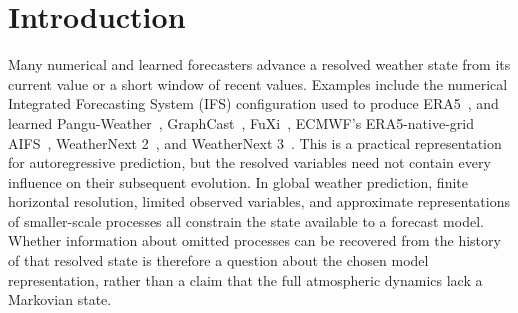 %
%

\section{Introduction}

Many numerical and learned forecasters advance a resolved weather state from its current value or a short window of recent values. Examples include the numerical Integrated Forecasting System (IFS) configuration used to produce ERA5~\cite{ecmwf2016ifsdynamics,hersbach2020era5}, and learned Pangu-Weather~\cite{bi2023pangu}, GraphCast~\cite{lam2023graphcast}, FuXi~\cite{chen2023fuxi}, ECMWF's ERA5-native-grid AIFS~\cite{lang2024aifs}, WeatherNext 2~\cite{alet2025weathernext2}, and WeatherNext 3~\cite{rasp2026weathernext3}. This is a practical representation for autoregressive prediction, but the resolved variables need not contain every influence on their subsequent evolution. In global weather prediction, finite horizontal resolution, limited observed variables, and approximate representations of smaller-scale processes all constrain the state available to a forecast model. Whether information about omitted processes can be recovered from the history of that resolved state is therefore a question about the chosen model representation, rather than a claim that the full atmospheric dynamics lack a Markovian state.

